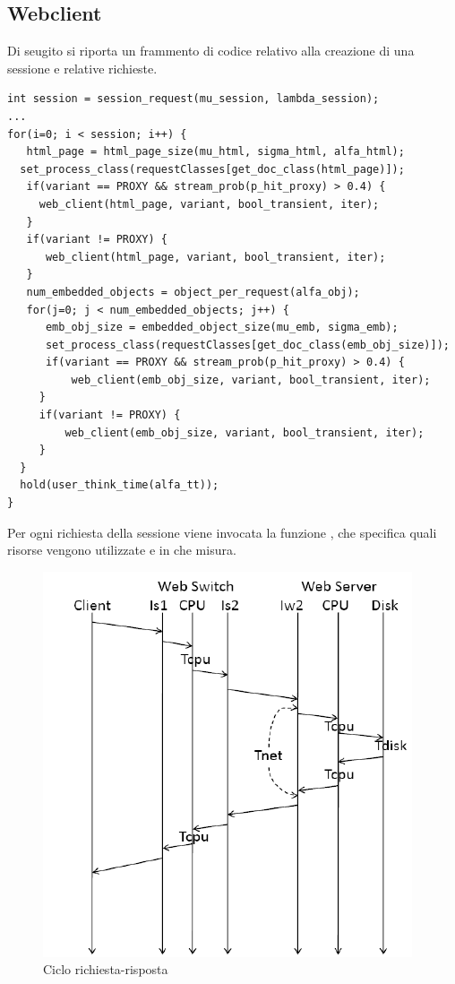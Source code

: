 \subsection{Webclient}
Di seugito si riporta un frammento di codice relativo alla creazione di una sessione e relative richieste. 
\begin{lstlisting}
int session = session_request(mu_session, lambda_session); 
...
for(i=0; i < session; i++) { 
   html_page = html_page_size(mu_html, sigma_html, alfa_html); 
  set_process_class(requestClasses[get_doc_class(html_page)]); 
   if(variant == PROXY && stream_prob(p_hit_proxy) > 0.4) { 
     web_client(html_page, variant, bool_transient, iter); 
   } 
   if(variant != PROXY) { 
      web_client(html_page, variant, bool_transient, iter); 
   } 
   num_embedded_objects = object_per_request(alfa_obj); 
   for(j=0; j < num_embedded_objects; j++) { 
      emb_obj_size = embedded_object_size(mu_emb, sigma_emb); 
      set_process_class(requestClasses[get_doc_class(emb_obj_size)]); 
      if(variant == PROXY && stream_prob(p_hit_proxy) > 0.4) { 
          web_client(emb_obj_size, variant, bool_transient, iter); 
     } 
     if(variant != PROXY) { 
         web_client(emb_obj_size, variant, bool_transient, iter); 
     } 
  } 
  hold(user_think_time(alfa_tt));
}
\end{lstlisting}
Per ogni richiesta della sessione viene invocata la funzione , che specifica quali risorse vengono utilizzate e in che misura. 
\begin{figure}[H]
\begin{center}
\includegraphics[scale=0.62]{etc/webclient.png}
\caption{Ciclo richiesta-risposta}
\label{webclient}
\end{center}
\end{figure}
